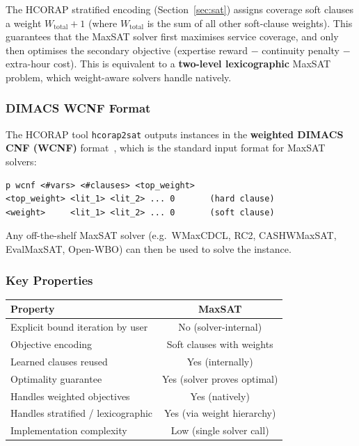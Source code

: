 \documentclass[11pt,a4paper]{article}
\begin{document}
The HCORAP stratified encoding
(Section~\ref{sec:sat}) assigns coverage soft clauses a weight
$W_{\text{total}} + 1$ (where $W_{\text{total}}$ is the sum of all other
soft-clause weights).  This guarantees that the MaxSAT solver first maximises
service coverage, and only then optimises the secondary objective (expertise
reward $-$ continuity penalty $-$ extra-hour cost).  This is equivalent to a
\textbf{two-level lexicographic} MaxSAT problem, which weight-aware solvers
handle natively.

\subsubsection{DIMACS WCNF Format}

The HCORAP tool \texttt{hcorap2sat} outputs instances in the
\textbf{weighted DIMACS CNF (WCNF)} format~\cite{maxsat-eval}, which is the
standard input format for MaxSAT solvers:

\begin{verbatim}
p wcnf <#vars> <#clauses> <top_weight>
<top_weight> <lit_1> <lit_2> ... 0       (hard clause)
<weight>     <lit_1> <lit_2> ... 0       (soft clause)
\end{verbatim}

Any off-the-shelf MaxSAT solver (e.g.\ WMaxCDCL, RC2, CASHWMaxSAT,
EvalMaxSAT, Open-WBO) can then be used to solve the instance.

\subsubsection{Key Properties}

\begin{center}
\begin{tabular}{lc}
\toprule
\textbf{Property} & \textbf{MaxSAT} \\
\midrule
Explicit bound iteration by user  & No (solver-internal) \\
Objective encoding                & Soft clauses with weights \\
Learned clauses reused            & Yes (internally) \\
Optimality guarantee              & Yes (solver proves optimal) \\
Handles weighted objectives       & Yes (natively) \\
Handles stratified / lexicographic & Yes (via weight hierarchy) \\
Implementation complexity         & Low (single solver call) \\
\bottomrule
\end{tabular}
\end{center}
\end{document}
